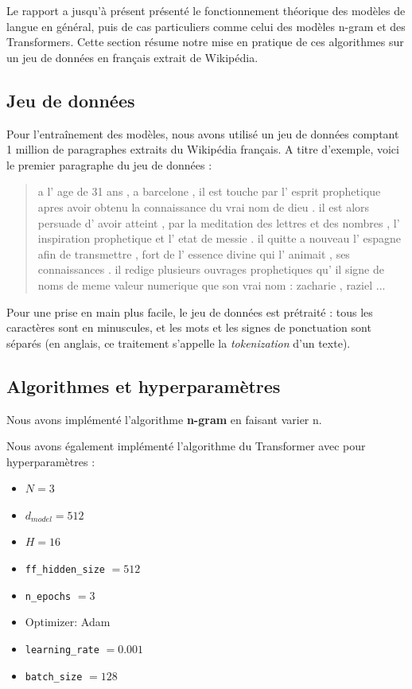 Le rapport a jusqu'à présent présenté le fonctionnement théorique des
modèles de langue en général, puis de cas particuliers comme celui des
modèles n-gram et des Transformers. Cette section résume notre mise en
pratique de ces algorithmes sur un jeu de données en français extrait de
Wikipédia.

\hypertarget{jeu-de-donnuxe9es}{%
\subsection{Jeu de données}\label{jeu-de-donnuxe9es}}

Pour l'entraînement des modèles, nous avons utilisé un jeu de données
comptant 1 million de paragraphes extraits du Wikipédia français. A
titre d'exemple, voici le premier paragraphe du jeu de données :

\begin{quotation}
a l' age de 31 ans , a barcelone , il est touche par l' esprit prophetique apres avoir obtenu la connaissance du vrai nom de dieu . il est alors persuade d' avoir atteint , par la meditation des lettres et des nombres , l' inspiration prophetique et l' etat de messie . il quitte a nouveau l' espagne afin de transmettre , fort de l' essence divine qui l' animait , ses connaissances . il redige plusieurs ouvrages prophetiques qu' il signe de noms de meme valeur numerique que son vrai nom : zacharie , raziel ...
\end{quotation}

Pour une prise en main plus facile, le jeu de données est prétraité :
tous les caractères sont en minuscules, et les mots et les signes de
ponctuation sont séparés (en anglais, ce traitement s'appelle la
\emph{tokenization} d'un texte).

\hypertarget{algorithmes-et-hyperparamuxe8tres}{%
\subsection{Algorithmes et
hyperparamètres}\label{algorithmes-et-hyperparamuxe8tres}}

Nous avons implémenté l'algorithme \textbf{n-gram} en faisant varier n.

Nous avons également implémenté l'algorithme du Transformer avec pour
hyperparamètres :

\begin{itemize}
\item
  \(N = 3\)
\item
  \(d_{model} = 512\)
\item
  \(H = 16\)
\item
  \texttt{ff\_hidden\_size} $ = 512$
\item
  \texttt{n\_epochs} $ = 3$
\item
  Optimizer: Adam
\item
  \texttt{learning\_rate} $ = 0.001 $
\item
  \texttt{batch\_size} $ = 128$
\end{itemize}

